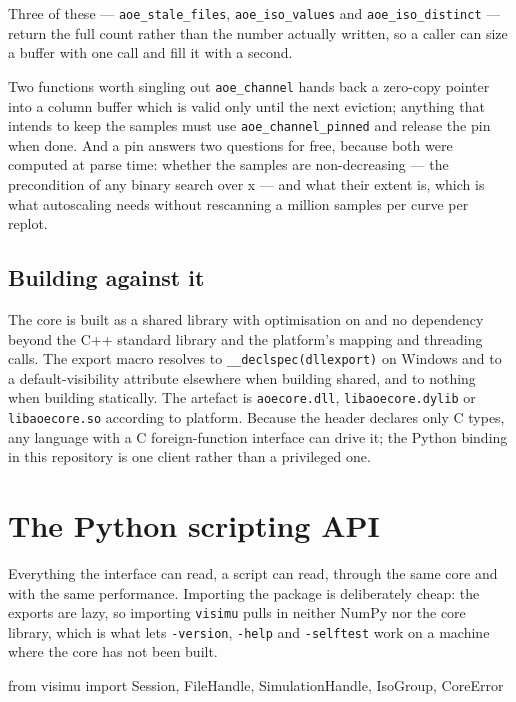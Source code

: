 \documentclass[11pt,a4paper,oneside]{report}
\newcommand{\code}[1]{\texttt{#1}}
\begin{document}
Three of these --- \code{aoe\_stale\_files}, \code{aoe\_iso\_values} and
\code{aoe\_iso\_distinct} --- return the full count rather than the number
actually written, so a caller can size a buffer with one call and fill it with a
second.

\begin{aoenote}{Two functions worth singling out}
\code{aoe\_channel} hands back a zero-copy pointer into a column buffer which is
valid only until the next eviction; anything that intends to keep the samples
must use \code{aoe\_channel\_pinned} and release the pin when done. And a pin
answers two questions for free, because both were computed at parse time:
whether the samples are non-decreasing --- the precondition of any binary search
over x --- and what their extent is, which is what autoscaling needs without
rescanning a million samples per curve per replot.
\end{aoenote}

\section{Building against it}

The core is built as a shared library with optimisation on and no dependency
beyond the C++ standard library and the platform's mapping and threading calls.
The export macro resolves to \code{\_\_declspec(dllexport)} on Windows and to a
default-visibility attribute elsewhere when building shared, and to nothing when
building statically. The artefact is \code{aoecore.dll},
\code{libaoecore.dylib} or \code{libaoecore.so} according to platform. Because
the header declares only C types, any language with a C foreign-function
interface can drive it; the Python binding in this repository is one client
rather than a privileged one.

\chapter{The Python scripting API}
\label{ch:scripting}

Everything the interface can read, a script can read, through the same core and
with the same performance. Importing the package is deliberately cheap: the
exports are lazy, so importing \code{visimu} pulls in neither NumPy nor the
core library, which is what lets \code{-version}, \code{-help} and
\code{-selftest} work on a machine where the core has not been built.

\begin{aoecode}
from visimu import Session, FileHandle, SimulationHandle, IsoGroup, CoreError
\end{aoecode}
\end{document}
